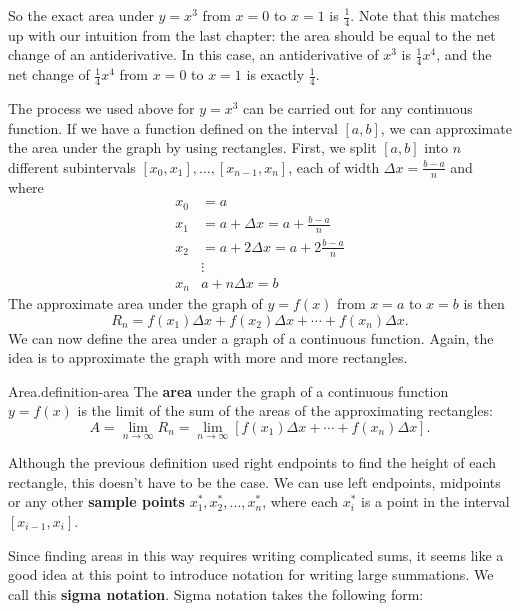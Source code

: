 \documentclass[10pt,]{book}
\newcommand{\terminology}[1]{\textbf{#1}}
\numberwithin{equation}{section}
\begin{document}
So the exact area under \(y = x^{3}\) from \(x=0\) to \(x=1\) is \(\frac{1}{4}\). Note that this matches up with our intuition from the last chapter: the area should be equal to the net change of an antiderivative. In this case, an antiderivative of \(x^{3}\) is \(\frac{1}{4}x^{4}\), and the net change of \(\frac{1}{4}x^{4}\) from \(x=0\) to \(x=1\) is exactly \(\frac{1}{4}\).%
\par
\hypertarget{p-407}{}%
The process we used above for \(y = x^{3}\) can be carried out for any continuous function. If we have a function defined on the interval \([a,b]\), we can approximate the area under the graph by using rectangles. First, we split \([a,b]\) into \(n\) different subintervals \([x_{0},x_{1}],\ldots,[x_{n-1},x_{n}]\), each of width \(\Delta x = \frac{b-a}{n}\) and where%
\begin{align*}
x_{0} & = a \\
x_{1} & = a + \Delta x = a+\frac{b-a}{n} \\
x_{2} & = a + 2\Delta x = a + 2\frac{b-a}{n}\\
& \vdots \\
x_{n} & a+n\Delta x = b
\end{align*}
The approximate area under the graph of \(y=f(x)\) from \(x=a\) to \(x=b\) is then%
\begin{equation*}
R_{n} = f(x_{1})\Delta x + f(x_{2})\Delta x + \cdots + f(x_{n})\Delta x.
\end{equation*}
We can now define the area under a graph of a continuous function. Again, the idea is to approximate the graph with more and more rectangles.%
\begin{definition}{Area.}{definition-area}%
\hypertarget{p-408}{}%
The \terminology{area} under the graph of a continuous function \(y=f(x)\) is the limit of the sum of the areas of the approximating rectangles:%
\begin{equation*}
A = \lim_{n\to\infty}R_{n} = \lim_{n\to\infty}[f(x_{1})\Delta x + \cdots + f(x_{n})\Delta x].
\end{equation*}
%
\end{definition}
\hypertarget{p-409}{}%
Although the previous definition used right endpoints to find the height of each rectangle, this doesn't have to be the case. We can use left endpoints, midpoints or any other \terminology{sample points} \(x_{1}^{*}, x_{2}^{*},\ldots,x_{n}^{*}\), where each \(x_{i}^{*}\) is a point in the interval \([x_{i-1},x_{i}].\)%
\par
\hypertarget{p-410}{}%
Since finding areas in this way requires writing complicated sums, it seems like a good idea at this point to introduce notation for writing large summations. We call this \terminology{sigma notation}. Sigma notation takes the following form:%
\end{document}
